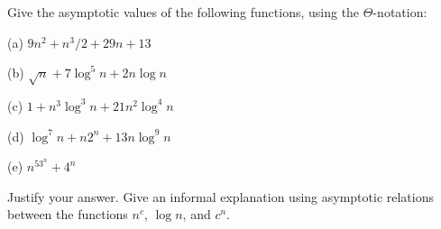
\begin{problem}
Give the asymptotic values of the
following functions, using the $\Theta$-notation:
%
\begin{description}
%
\item{(a)} $9n^2 + n^3/2 + 29n + 13$
\item{(b)} $\sqrt{n}+ 7\log^5 n + 2n\log n$
\item{(c)} $1+ n^3\log^3n + 21 n^2\log^4n$
\item{(d)} $\log^7n + n 2^n + 13n\log^9n$
\item{(e)} $n^53^n+4^n$
%
\end{description}
%
Justify your answer.
Give an informal explanation using asymptotic
relations between the functions $n^c$, $\log n$, and $c^n$.
\end{problem}


